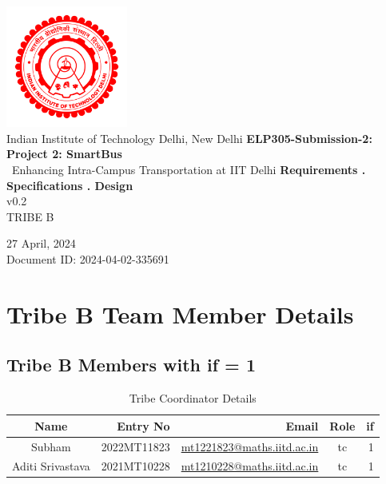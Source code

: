 \documentclass[12pt]{article} %
\begin{document}
\begin{titlepage}
\thispagestyle{empty}
\centering
\includegraphics[width=0.3\textwidth]{logo.png}
\\
\large{Indian Institute of Technology Delhi, New Delhi}
\vfill
\centering
\vspace{7pt}
{\huge\textbf{ELP305-Submission-2:\\ Project 2: SmartBus\\}}
{\Large\ Enhancing Intra-Campus Transportation at IIT Delhi}
{\LARGE{\textbf{Requirements . Specifications . Design} \\ v0.2}}
\\

{\large{TRIBE B}}


\vspace{0.5cm}
\Huge\textbf{}
\vspace{0.1cm}
\vfill
\large{27 April, 2024\\}
\large{Document ID: 2024-04-02-335691\\}



\end{titlepage}



\clearpage
\section{Tribe B Team Member Details}
\subsection{Tribe B Members with  \acrshort{if} = 1}
\begin{table}[h!]
\centering

\begin{tabular}{|c|r|r|c|r|}
\hline
Name & Entry No & Email & Role & \acrshort{if} \\
\hline
Subham & 2022MT11823 & \href{mailto:mt1221823@maths.iitd.ac.in}{mt1221823@maths.iitd.ac.in} & \acrshort{tc} & 1 \\
Aditi Srivastava & 2021MT10228 & \href{mailto:mt1210228@maths.iitd.ac.in}{mt1210228@maths.iitd.ac.in} & \acrshort{tc} & 1 \\
\hline
\end{tabular}
\caption{Tribe Coordinator Details}
\label{tab:teamDetails}
\end{table}
\end{document}
